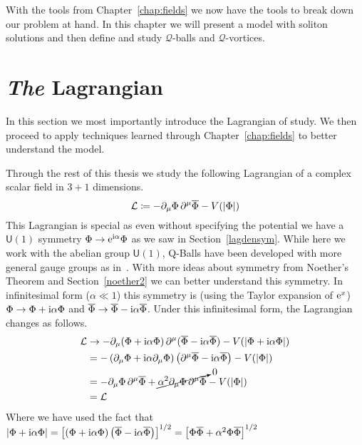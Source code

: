 
With the tools from Chapter~\ref{chap:fields} we now have the tools to break
down our problem at hand. In this chapter we will present a model with soliton
solutions and then define and study \(\mathcal{Q}\)-balls and
\(\mathcal{Q}\)-vortices.

\section{\textit{The} Lagrangian}
In this section we most importantly introduce the Lagrangian of study. We then
proceed to apply techniques learned through Chapter~\ref{chap:fields} to better
understand the model.

Through the rest of this thesis we study the following Lagrangian of a complex
scalar field in \(3+1\) dimensions.
\begin{equation}\label{eq:complexlag}
    \mathcal{L}\coloneqq -\partial_\mu\Phi\,\partial^\mu\overline{\Phi} - V(|\Phi|)
\end{equation}
This Lagrangian is special as even without specifying the potential we have a
\(\mathsf{U}(1)\) symmetry \(\Phi \to \mathrm{e}^{\mathrm{i}\alpha}\Phi\) as we saw in
Section~\ref{lagdensym}. While here we work with the abelian group
\(\mathsf{U}(1)\), Q-Balls have been developed with more general gauge groups as
in~\cite{nonabelian}. With more ideas about symmetry from Noether's Theorem and
Section~\ref{noether2} we can better understand this symmetry. In infinitesimal
form (\(\alpha\ll 1\)) this symmetry is (using the Taylor expansion of \(\mathrm{e}^x\))
\(\Phi \to \Phi + \mathrm{i}\alpha\Phi\) and \(\overline{\Phi} \to \overline{\Phi} - \mathrm{i}\alpha\overline{\Phi}\).
Under this infinitesimal form, the Lagrangian changes as follows.
\begin{align}
    \mathcal{L} & \to -\partial_\mu(\Phi + \mathrm{i}\alpha\Phi)\,\partial^\mu(\overline{\Phi} - \mathrm{i}\alpha\overline{\Phi}) - V(|\Phi + \mathrm{i}\alpha\Phi|)               \\
         & = -\left(\partial_\mu\Phi + \mathrm{i}\alpha\partial_\mu\Phi\right)\left(\partial^\mu\overline{\Phi} - \mathrm{i}\alpha\overline{\Phi}\right) - V(|\Phi|) \\
         & = -\partial_\mu\Phi\,\partial^\mu\overline{\Phi} + \cancelto{0}{\alpha^2\partial_\mu\Phi\,\partial^\mu\overline{\Phi}} - V(|\Phi|)          \\
         & = \mathcal{L}
\end{align}
Where we have used the fact that \(|\Phi + \mathrm{i}\alpha\Phi| = \left[\left(\Phi + \mathrm{i}\alpha\Phi\right)\left(\overline{\Phi} - \mathrm{i}\alpha\overline{\Phi}\right)\right]^{1/2} = \left[\Phi\overline{\Phi} + \alpha^2\Phi\overline{\Phi}\right]^{1/2}\)
